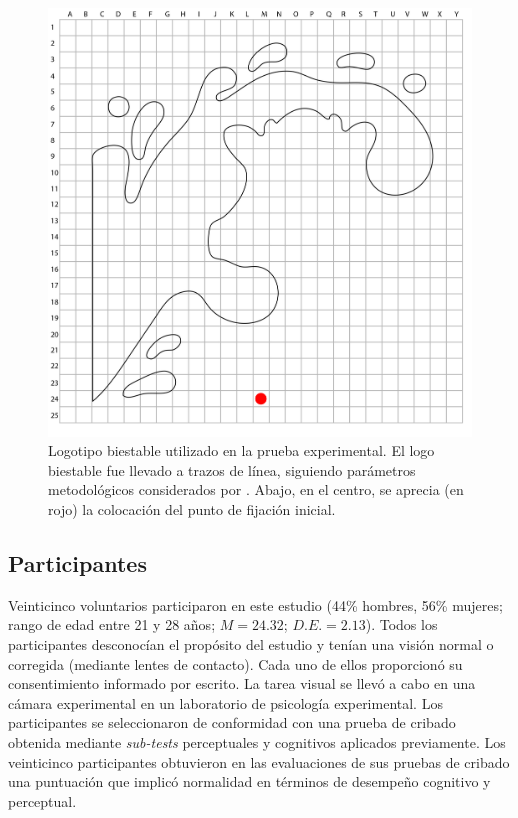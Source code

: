 \documentclass[spanish]{textolivre}
\begin{document}
\begin{figure}
\centering
\begin{minipage}{.75\textwidth}
    \includegraphics[width=\linewidth]{Fig4.jpeg}
    \caption{Logotipo biestable utilizado en la prueba experimental. El logo biestable fue llevado a trazos de línea, siguiendo parámetros metodológicos considerados por \textcite{groner_eye-movement_1983,marroquin-ciendua_modulacion_2020,rodriguez-martinez_can_2024}. Abajo, en el centro, se aprecia (en rojo) la colocación del punto de fijación inicial.}
    \label{fig4}
\end{minipage}
\end{figure}

\subsection{Participantes}\label{sec-conduta}

Veinticinco voluntarios participaron en este estudio (44\% hombres, 56\% mujeres; rango de edad entre 21 y 28 años; $M = 24.32$; $D.E. = 2.13$). Todos los participantes desconocían el propósito del estudio y tenían una visión normal o corregida (mediante lentes de contacto). Cada uno de ellos proporcionó su consentimiento informado por escrito. La tarea visual se llevó a cabo en una cámara experimental en un laboratorio de psicología experimental. Los participantes se seleccionaron de conformidad con una prueba de cribado obtenida mediante \textit{sub-tests} perceptuales y cognitivos aplicados previamente. Los veinticinco participantes obtuvieron en las evaluaciones de sus pruebas de cribado una puntuación que implicó normalidad en términos de desempeño cognitivo y perceptual.
\end{document}
